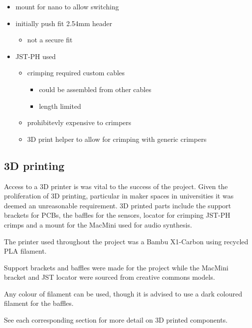 \begin{itemize}
\tightlist
\item
  mount for nano to allow switching
\item
  initially push fit 2.54mm header

  \begin{itemize}
  \tightlist
  \item
    not a secure fit
  \end{itemize}
\item
  JST-PH used

  \begin{itemize}
  \tightlist
  \item
    crimping required custom cables

    \begin{itemize}
    \tightlist
    \item
      could be assembled from other cables
    \item
      length limited
    \end{itemize}
  \item
    prohibitevly expensive to crimpers
  \item
    3D print helper to allow for crimping with generic crimpers
  \end{itemize}
\end{itemize}

\subsection{3D printing}\label{d-printing}

Access to a 3D printer is was vital to the success of the project. Given
the proliferation of 3D printing, particular in maker spaces in
universities it was deemed an unreasonable requirement. 3D printed parts
include the support brackets for PCBs, the baffles for the sensors,
locator for crimping JST-PH crimps and a mount for the MacMini used for
audio synthesis.

The printer used throughout the project was a Bambu X1-Carbon using
recycled PLA filament.

Support brackets and baffles were made for the project while the MacMini
bracket and JST locator were sourced from creative commons models.

Any colour of filament can be used, though it is advised to use a dark
coloured filament for the baffles.

See each corresponding section for more detail on 3D printed components.

